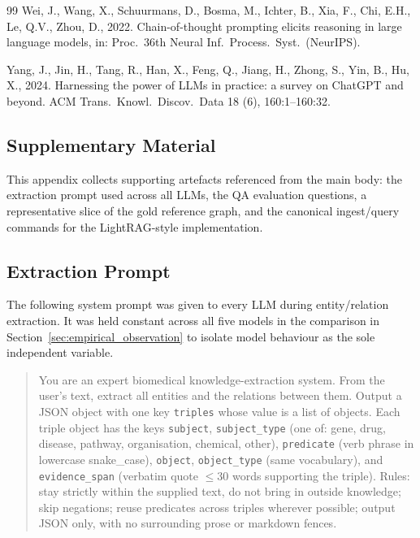 \documentclass[12pt,a4paper,oneside]{report}
\begin{document}
\begin{thebibliography}{99}
Wei, J., Wang, X., Schuurmans, D., Bosma, M., Ichter, B., Xia, F.,
Chi, E.H., Le, Q.V., Zhou, D., 2022. Chain-of-thought prompting
elicits reasoning in large language models, in: Proc.\ 36th Neural
Inf.\ Process.\ Syst.\ (NeurIPS).

Yang, J., Jin, H., Tang, R., Han, X., Feng, Q., Jiang, H., Zhong, S.,
Yin, B., Hu, X., 2024. Harnessing the power of LLMs in practice: a
survey on ChatGPT and beyond. ACM Trans.\ Knowl.\ Discov.\ Data 18
(6), 160:1--160:32.

\end{thebibliography}

\clearpage
\begin{appendices}

\chapter{Supplementary Material}
\label{app:supplementary}

This appendix collects supporting artefacts referenced from the main
body: the extraction prompt used across all LLMs, the QA evaluation
questions, a representative slice of the gold reference graph, and the
canonical ingest/query commands for the LightRAG-style implementation.

\section{Extraction Prompt}
\label{app:extraction_prompt}

The following system prompt was given to every LLM during
entity/relation extraction. It was held constant across all five models
in the comparison in Section~\ref{sec:empirical_observation} to isolate
model behaviour as the sole independent variable.

\begin{quote}\small
You are an expert biomedical knowledge-extraction system. From the user's
text, extract all entities and the relations between them. Output a JSON
object with one key \texttt{triples} whose value is a list of objects.
Each triple object has the keys \texttt{subject}, \texttt{subject\_type}
(one of: gene, drug, disease, pathway, organisation, chemical, other),
\texttt{predicate} (verb phrase in lowercase snake\_case),
\texttt{object}, \texttt{object\_type} (same vocabulary), and
\texttt{evidence\_span} (verbatim quote $\le$30 words supporting the
triple). Rules: stay strictly within the supplied text, do not bring
in outside knowledge; skip negations; reuse predicates across triples
wherever possible; output JSON only, with no surrounding prose or
markdown fences.
\end{quote}


\end{appendices}
\end{document}
